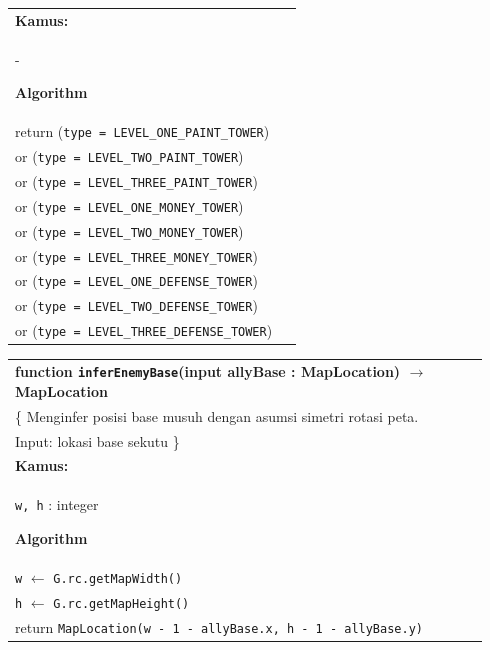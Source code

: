 \documentclass{article}
\newenvironment{pseudobox}
{
\centering
\begin{longtable}{|p{0.94\linewidth}|}
\hline
}
{
\\ \hline
\end{longtable}
\vspace{0.05cm}
}
\begin{document}
\begin{enumerate}[label=\alph*.]
\begin{enumerate}[label=\alph*.]
\begin{pseudobox}
\textbf{Kamus:} \\
\hspace*{1.5em}-

\textbf{Algorithm} \\
\hspace*{1.5em}return (\texttt{type = LEVEL\_ONE\_PAINT\_TOWER}) \\
\hspace*{4.5em}or (\texttt{type = LEVEL\_TWO\_PAINT\_TOWER}) \\
\hspace*{4.5em}or (\texttt{type = LEVEL\_THREE\_PAINT\_TOWER}) \\
\hspace*{4.5em}or (\texttt{type = LEVEL\_ONE\_MONEY\_TOWER}) \\
\hspace*{4.5em}or (\texttt{type = LEVEL\_TWO\_MONEY\_TOWER}) \\
\hspace*{4.5em}or (\texttt{type = LEVEL\_THREE\_MONEY\_TOWER}) \\
\hspace*{4.5em}or (\texttt{type = LEVEL\_ONE\_DEFENSE\_TOWER}) \\
\hspace*{4.5em}or (\texttt{type = LEVEL\_TWO\_DEFENSE\_TOWER}) \\
\hspace*{4.5em}or (\texttt{type = LEVEL\_THREE\_DEFENSE\_TOWER})
\end{pseudobox}

\begin{pseudobox}
\textbf{function \texttt{inferEnemyBase}(input allyBase : MapLocation) $\rightarrow$ MapLocation} \\
\{ Menginfer posisi base musuh dengan asumsi simetri rotasi peta. \\
Input:  lokasi base sekutu
\} \\

\textbf{Kamus:} \\
\hspace*{1.5em}\texttt{w, h} : integer

\textbf{Algorithm} \\
\hspace*{1.5em}\texttt{w} $\leftarrow$ \texttt{G.rc.getMapWidth()} \\
\hspace*{1.5em}\texttt{h} $\leftarrow$ \texttt{G.rc.getMapHeight()} \\
\hspace*{1.5em}return \texttt{MapLocation(w - 1 - allyBase.x, h - 1 - allyBase.y)}
\end{pseudobox}


\end{enumerate}
\end{enumerate}
\end{document}

